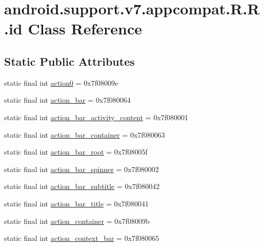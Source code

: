 \hypertarget{classandroid_1_1support_1_1v7_1_1appcompat_1_1_r_1_1id}{
\section{android.support.v7.appcompat.R.R.id Class Reference}
\label{classandroid_1_1support_1_1v7_1_1appcompat_1_1_r_1_1id}
}
\subsection*{Static Public Attributes}
\begin{CompactItemize}
\item 
static final int \hyperlink{classandroid_1_1support_1_1v7_1_1appcompat_1_1_r_1_1id_e5f0b2be7d0d3e1e754e8daddd7e68d9}{action0} = 0x7f08009e
\item 
static final int \hyperlink{classandroid_1_1support_1_1v7_1_1appcompat_1_1_r_1_1id_6e7d41b9acb791a5a25da3c7334c7636}{action\_\-bar} = 0x7f080064
\item 
static final int \hyperlink{classandroid_1_1support_1_1v7_1_1appcompat_1_1_r_1_1id_40c1c27384cb668ad921c7a0ad79360f}{action\_\-bar\_\-activity\_\-content} = 0x7f080001
\item 
static final int \hyperlink{classandroid_1_1support_1_1v7_1_1appcompat_1_1_r_1_1id_9ed358a683b2b60cdf2ab8128cb5a514}{action\_\-bar\_\-container} = 0x7f080063
\item 
static final int \hyperlink{classandroid_1_1support_1_1v7_1_1appcompat_1_1_r_1_1id_03a42817bf4aaea900863666b0a0ed17}{action\_\-bar\_\-root} = 0x7f08005f
\item 
static final int \hyperlink{classandroid_1_1support_1_1v7_1_1appcompat_1_1_r_1_1id_040742d9504ec32b17d5c6457fb6212a}{action\_\-bar\_\-spinner} = 0x7f080002
\item 
static final int \hyperlink{classandroid_1_1support_1_1v7_1_1appcompat_1_1_r_1_1id_e0ce1554d9c0ed30f622d57aebad163a}{action\_\-bar\_\-subtitle} = 0x7f080042
\item 
static final int \hyperlink{classandroid_1_1support_1_1v7_1_1appcompat_1_1_r_1_1id_98ca1e30d2b7cb037512fc165bf06872}{action\_\-bar\_\-title} = 0x7f080041
\item 
static final int \hyperlink{classandroid_1_1support_1_1v7_1_1appcompat_1_1_r_1_1id_a91224c5435ed0b6534595b5b05e398a}{action\_\-container} = 0x7f08009b
\item 
static final int \hyperlink{classandroid_1_1support_1_1v7_1_1appcompat_1_1_r_1_1id_a2925664e0b5c3dc78b783c40a4568bc}{action\_\-context\_\-bar} = 0x7f080065

\end{CompactItemize}
